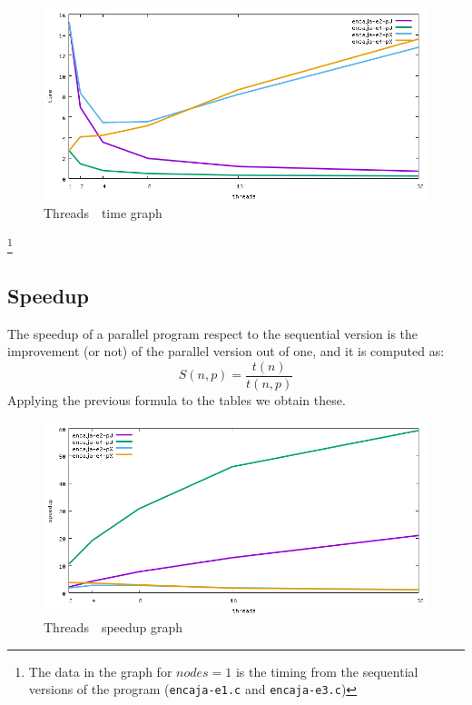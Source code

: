 \documentclass[a4paper]{article}
\begin{document}
\begin{figure}[h]
    \centering
    \includegraphics[width=\textwidth]{../img/time}
    \caption{Threads\, \textemdash \unskip \, time graph \protect\footnotemark }
\end{figure}

\footnote{The data in the graph for $nodes=1$ is the timing from the sequential versions of the program (\texttt{encaja-e1.c} and \texttt{encaja-e3.c})}

\subsection{Speedup}
The speedup of a parallel program respect to the sequential version is the improvement (or not) of the parallel version out of one, and it is computed as:
$$S(n,p)=\frac{t(n)}{t(n,p)}$$
Applying the previous formula to the tables we obtain these. 

\begin{figure}[h]
    \centering
    \includegraphics[width=\textwidth]{../img/speedup}
    \caption{Threads\, \textemdash \unskip \, speedup graph}
\end{figure}
\end{document}
